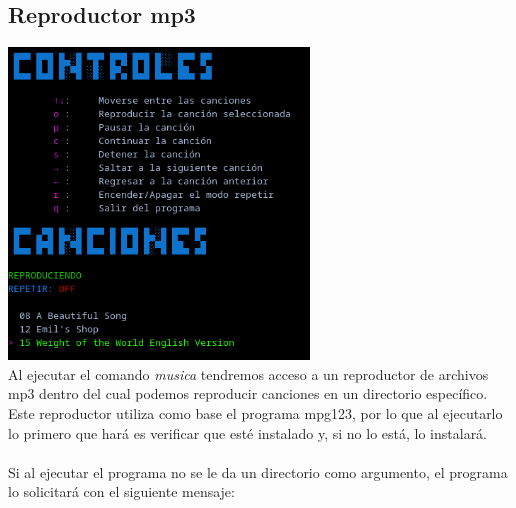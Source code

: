 \documentclass[12pt,a4paper]{article}
\begin{document}
\subsection{Reproductor mp3}
    \centering
    \includegraphics[width=8cm]{img/musica.png}
    \\
    \justifying
    \noindent
    Al ejecutar el comando \textit{musica} tendremos acceso a un reproductor de archivos mp3 dentro del cual podemos reproducir canciones en un directorio específico. Este reproductor utiliza como base el programa mpg123, por lo que al ejecutarlo lo primero que hará es verificar que esté instalado y, si no lo está, lo instalará.
    \\\\ 
    Si al ejecutar el programa no se le da un directorio como argumento, el programa lo solicitará con el siguiente mensaje:
    \\
    
\end{document}
